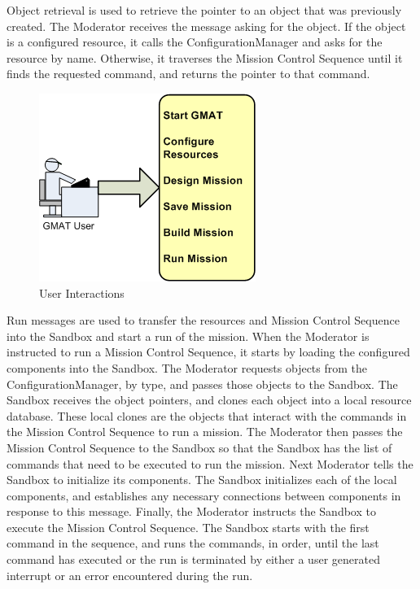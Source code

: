 Object retrieval is used to retrieve the pointer to an object that was previously created.  The
Moderator receives the message asking for the object.  If the object is a configured resource, it
calls the ConfigurationManager and asks for the resource by name.  Otherwise, it traverses the
Mission Control Sequence until it finds the requested command, and returns the pointer to that
command.

\begin{figure}
\begin{center}
\includegraphics[133,116]{Images/GMAT_UserPerspective.png}
\caption{\label{figure:UserWorkFlow}User Interactions}
\end{center}
\end{figure}

Run messages are used to transfer the resources and Mission Control Sequence into the Sandbox and
start a run of the mission.  When the Moderator is instructed to run a Mission Control Sequence, it
starts by loading the configured components into the Sandbox.  The Moderator requests objects from
the ConfigurationManager, by type, and passes those objects to the Sandbox.  The Sandbox receives
the object pointers, and clones each object into a local resource database.  These local clones are
the objects that interact with the commands in the Mission Control Sequence to run a mission.  The
Moderator then passes the Mission Control Sequence to the Sandbox so that the Sandbox has the list
of commands that need to be executed to run the mission.  Next Moderator tells the Sandbox to
initialize its components.  The Sandbox initializes each of the local components, and establishes
any necessary connections between components in response to this message.  Finally, the Moderator
instructs the Sandbox to execute the Mission Control Sequence.  The Sandbox starts with the first
command in the sequence, and runs the commands, in order, until the last command has executed or the
run is terminated by either a user generated interrupt or an error encountered during the run.


